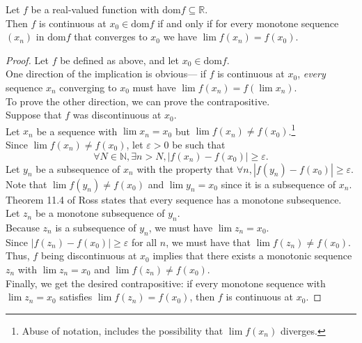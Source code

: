 \documentclass{article}
\newenvironment{theorem}[1]{\renewcommand\theinnercustomthm{#1}\innercustomthm}
  {\endinnercustomthm}
\begin{document}
\newpage{}
\begin{theorem}{3}
    Let $f$ be a real-valued function with $\mathrm{dom}f \subseteq \mathbb R$. \\
    Then $f$ is continuous at $x_0 \in \mathrm{dom} f$ if and only if for every monotone sequence $(x_n)$ in $\mathrm{dom}f$ that converges to $x_0$ we have $\lim f(x_n) = f(x_0)$.
\end{theorem}
\begin{proof}
    Let $f$ be defined as above, and let $x_0 \in \mathrm{dom} f$. \\
    One direction of the implication is obvious--- if $f$ is continuous at $x_0$, \emph{every} sequence $x_n$ converging to $x_0$ must have $\lim f(x_n) = f(\lim x_n)$. \\
    To prove the other direction, we can prove the contrapositive. \\
    Suppose that $f$ was discontinuous at $x_0$. \\
    Let $x_n$ be a sequence with $\lim x_n = x_0$ but $\lim f(x_n) \neq f(x_0)$.\footnote{Abuse of notation, includes the possibility that $\lim f(x_n)$ diverges.} \\
    Since $\lim f(x_n) \neq f(x_0)$, let $\varepsilon > 0$ be such that \[\forall N \in \mathbb N,\exists n>N,|f(x_n)-f(x_0)| \ge \varepsilon.\]
    Let $y_n$ be a subsequence of $x_n$ with the property that $\forall n,|f(y_n) - f(x_0)| \ge \varepsilon$. \\
    Note that $\lim f(y_n) \neq f(x_0)$ and $\lim y_n = x_0$ since it is a subsequence of $x_n$. \\
    Theorem 11.4 of Ross states that every sequence has a monotone subsequence. \\ Let $z_n$ be a monotone subsequence of $y_n$. \\
    Because $z_n$ is a subsequence of $y_n$, we must have $\lim z_n = x_0$. \\
    Since $|f(z_n) - f(x_0)| \ge \varepsilon$ for all $n$, we must have that $\lim f(z_n) \neq f(x_0)$. \\
    Thus, $f$ being discontinuous at $x_0$ implies that there exists a monotonic sequence $z_n$ with $\lim z_n = x_0$ and $\lim f(z_n) \neq f(x_0)$. \\
    Finally, we get the desired contrapositive: if every monotone sequence with $\lim z_n = x_0$ satisfies $\lim f(z_n) = f(x_0)$, then $f$ is continuous at $x_0$.
\end{proof}
\end{document}

